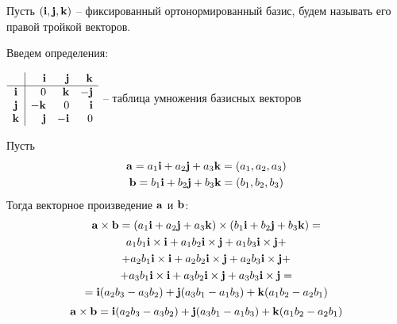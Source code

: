 \begin{definition}
    Пусть $(\mathbf{i}, \mathbf{j}, \mathbf{k})$ -- фиксированный ортонормированный базис,
    будем называть его правой тройкой векторов.

    Введем определения:
    \begin{center}
        $\begin{array}{c|rrr}
                    & \mathbf{i}  & \mathbf{j}  & \mathbf{k}  \\ \hline
                \mathbf{i} & 0  & \mathbf{k}  & -\mathbf{j} \\
                \mathbf{j} & -\mathbf{k} & 0  & \mathbf{i}  \\
                \mathbf{k} & \mathbf{j}  & -\mathbf{i} & 0
            \end{array}$
        -- таблица умножения базисных векторов
    \end{center}

    Пусть
    \begin{gather*}
        \mathbf{a} = a_1 \mathbf{i} + a_2 \mathbf{j} + a_3 \mathbf{k} = (a_1, a_2, a_3)\\
        \mathbf{b} = b_1 \mathbf{i} + b_2 \mathbf{j} + b_3 \mathbf{k} = (b_1, b_2, b_3)
    \end{gather*}
    Тогда векторное произведение $\mathbf{a}$ и $\mathbf{b}$:
    \begin{multline*}
        \mathbf{a} \times \mathbf{b} =
        (a_1 \mathbf{i} + a_2 \mathbf{j} + a_3 \mathbf{k}) \times (b_1 \mathbf{i} + b_2 \mathbf{j} + b_3 \mathbf{k})=\\
        a_1 b_1 \mathbf{i} \times \mathbf{i} + a_1 b_2 \mathbf{i} \times \mathbf{j} + a_1 b_3 \mathbf{i} \times \mathbf{j}+\\
        +a_2 b_1 \mathbf{i} \times \mathbf{i} + a_2 b_2 \mathbf{i} \times \mathbf{j} + a_2 b_3 \mathbf{i} \times \mathbf{j}+\\
        +a_3 b_1 \mathbf{i} \times \mathbf{i} + a_3 b_2 \mathbf{i} \times \mathbf{j} + a_3 b_3 \mathbf{i} \times \mathbf{j}=\\
        = \mathbf{i} (a_2 b_3 - a_3 b_2)+ \mathbf{j} (a_3 b_1 - a_1 b_3) + \mathbf{k} (a_1 b_2 - a_2 b_1)
    \end{multline*}
    \[\mathbf{a} \times \mathbf{b} = \mathbf{i} (a_2 b_3 - a_3 b_2)+ \mathbf{j} (a_3 b_1 - a_1 b_3) + \mathbf{k} (a_1 b_2 - a_2 b_1)\]
\end{definition}


